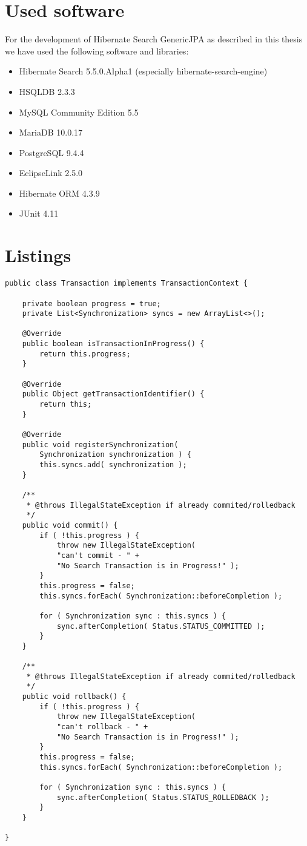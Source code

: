 \section*{Used software}

For the development of Hibernate Search GenericJPA as described in this thesis we have used the following software and libraries:

\begin{itemize}
	\item Hibernate Search 5.5.0.Alpha1 (especially hibernate-search-engine)
	\item HSQLDB 2.3.3
	\item MySQL Community Edition 5.5
	\item MariaDB 10.0.17
	\item PostgreSQL 9.4.4
	\item EclipseLink 2.5.0
	\item Hibernate ORM 4.3.9
	\item JUnit 4.11
\end{itemize}

\pagebreak

\section*{Listings}

\lstset{language=java}
\begin{lstlisting}[frame=htrbl, caption={the simple Transaction contract}, label={lst:Transaction.java}]
public class Transaction implements TransactionContext {

	private boolean progress = true;
	private List<Synchronization> syncs = new ArrayList<>();
	
	@Override
	public boolean isTransactionInProgress() {
		return this.progress;
	}
	
	@Override
	public Object getTransactionIdentifier() {
		return this;
	}
	
	@Override
	public void registerSynchronization(
		Synchronization synchronization ) {
		this.syncs.add( synchronization );
	}
	
	/**
	 * @throws IllegalStateException if already commited/rolledback
	 */
	public void commit() {
		if ( !this.progress ) {
			throw new IllegalStateException( 
			"can't commit - " + 
			"No Search Transaction is in Progress!" );
		}
		this.progress = false;
		this.syncs.forEach( Synchronization::beforeCompletion );
		
		for ( Synchronization sync : this.syncs ) {
			sync.afterCompletion( Status.STATUS_COMMITTED );
		}
	}
	
	/**
	 * @throws IllegalStateException if already commited/rolledback
 	 */
	public void rollback() {
		if ( !this.progress ) {
			throw new IllegalStateException( 
			"can't rollback - " + 
			"No Search Transaction is in Progress!" );
		}
		this.progress = false;
		this.syncs.forEach( Synchronization::beforeCompletion );
	
		for ( Synchronization sync : this.syncs ) {
			sync.afterCompletion( Status.STATUS_ROLLEDBACK );
		}
	}

}
\end{lstlisting}

